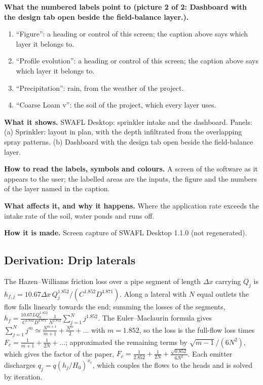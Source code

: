 \textbf{What the numbered labels point to (picture 2 of 2: Dashboard with the design tab open beside the field-balance layer.).}
\begin{enumerate}[nosep,label=\protect\circled{\arabic*}]
\item ``Figure'': a heading or control of this screen; the caption above says which layer it belongs to.
\item ``Profile evolution'': a heading or control of this screen; the caption above says which layer it belongs to.
\item ``Precipitation'': rain, from the weather of the project.
\item ``Coarse Loam v'': the soil of the project, which every layer uses.
\end{enumerate}

\textbf{What it shows.} SWAFL Desktop: sprinkler intake and the dashboard. Panels: (a) Sprinkler: layout in plan, with the depth infiltrated from the overlapping spray patterns. (b) Dashboard with the design tab open beside the field-balance layer.

\textbf{How to read the labels, symbols and colours.} A screen of the software as it appears to the user; the labelled areas are the inputs, the figure and the numbers of the layer named in the caption.

\textbf{What affects it, and why it happens.} Where the application rate exceeds the intake rate of the soil, water ponds and runs off. 

\textbf{How it is made.} Screen capture of SWAFL Desktop 1.1.0 (not regenerated).


\subsection{Derivation: Drip laterals}\label{der:s2:11}
The Hazen--Williams friction loss over a pipe segment of length $\Delta x$ carrying $Q_j$ is $h_{f,j}=10.67\Delta x\,Q_j^{1.852}/(C^{1.852}D^{4.871})$. Along a lateral with $N$ equal outlets the flow falls linearly towards the end; summing the losses of the segments, $h_f=\frac{10.67LQ_0^{1.852}}{C^{1.852}D^{4.871}}\frac1{N^{2.852}}\sum_{j=1}^{N}j^{1.852}$. The Euler--Maclaurin formula gives $\sum_{j=1}^Nj^{m}\simeq\frac{N^{m+1}}{m+1}+\frac{N^m}{2}+\dots$ with $m=1.852$, so the loss is the full-flow loss times $F_c=\frac1{m+1}+\frac1{2N}+\dots$; \citet{Christiansen1942} approximated the remaining terms by $\sqrt{m-1}/(6N^2)$, which gives the factor of the paper, $F_c=\frac1{2.852}+\frac1{2N}+\frac{\sqrt{0.852}}{6N^2}$. Each emitter discharges $q_j=q(h_j/H_0)^{x_e}$, which couples the flows to the heads and is solved by iteration.


